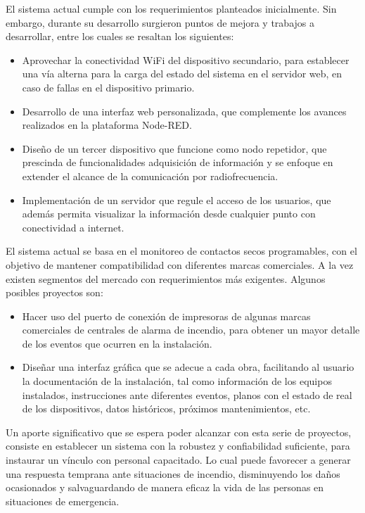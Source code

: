 El sistema actual cumple con los requerimientos planteados inicialmente. Sin embargo, durante su desarrollo surgieron puntos de mejora y trabajos a desarrollar, entre los cuales se resaltan los siguientes:

\begin{itemize}
\item Aprovechar la conectividad WiFi del dispositivo secundario, para establecer una vía alterna para la carga del estado del sistema en el servidor web, en caso de fallas en el dispositivo primario.
\item Desarrollo de una interfaz web personalizada, que complemente los avances realizados en la plataforma Node-RED. 
\item Diseño de un tercer dispositivo que funcione como nodo repetidor, que prescinda de funcionalidades adquisición de información y se enfoque en extender el alcance de la comunicación por radiofrecuencia.    
\item Implementación de un servidor que regule el acceso de los usuarios, que además permita visualizar la información desde cualquier punto con conectividad a internet.
\end{itemize}

El sistema actual se basa en el monitoreo de contactos secos programables, con el objetivo de mantener compatibilidad con diferentes marcas comerciales. A la vez existen segmentos del mercado con requerimientos más exigentes. Algunos posibles proyectos son:


\begin{itemize}
\item Hacer uso del puerto de conexión de impresoras de algunas marcas comerciales de centrales de alarma de incendio, para obtener un mayor detalle de los eventos que ocurren en la instalación.
\item Diseñar una interfaz gráfica que se adecue a cada obra, facilitando al usuario la documentación de la instalación, tal como información de los equipos instalados, instrucciones ante diferentes eventos, planos con el estado de real de los dispositivos, datos históricos, próximos mantenimientos, etc.
\end{itemize}

Un aporte significativo que se espera poder alcanzar con esta serie de proyectos, consiste en establecer un sistema con la robustez y confiabilidad suficiente, para instaurar un vínculo con personal capacitado. Lo cual puede favorecer a generar una respuesta temprana ante situaciones de incendio, disminuyendo los daños ocasionados y salvaguardando de manera eficaz la vida de las personas en situaciones de emergencia. 
